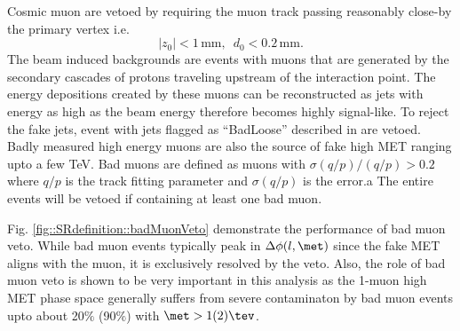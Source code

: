 Cosmic muon are vetoed by requiring the muon track passing reasonably close-by the primary vertex i.e.
$$
|z_0| < 1\, \mathrm{mm}, \,\,\, d_0<0.2\, \mathrm{mm}.
$$
The beam induced backgrounds are events with muons that are generated by the secondary cascades of protons traveling upstream of the interaction point. The energy depositions created by these muons can be reconstructed as jets with energy as high as the beam energy therefore becomes highly signal-like. To reject the fake jets, event with jets flagged as ``BadLoose'' described in \cite{BadJetCriteriaATLAS2015} are vetoed. \\

Badly measured high energy muons are also the source of fake high MET ranging upto a few TeV.
Bad muons are defined as muons with $\sigma(q/p) / (q/p) > 0.2$ where $q/p$ is the track fitting parameter and $\sigma(q/p)$ is the error.a
The entire events will be vetoed if containing at least one bad muon.


Fig. \ref{fig::SRdefinition::badMuonVeto} demonstrate the performance of bad muon veto. While bad muon events typically peak in $\Delta \phi (l,\met)$ since the fake MET aligns with the muon, it is exclusively resolved by the veto. Also, the role of bad muon veto is shown to be very important in this analysis as the 1-muon high MET phase space generally suffers from severe contaminaton by bad muon events upto about 20$\%$ (90$\%$) with  $\met>1(2)\tev$.  \\

